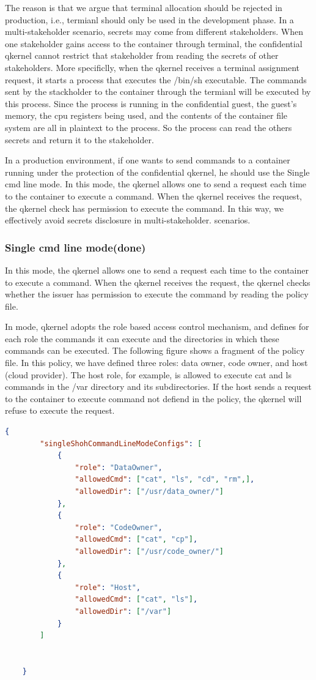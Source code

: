 The reason is that we argue that terminal allocation should be rejected in production, i.e., termianl should only be used in the development phase. In a multi-stakeholder scenario, secrets may come from different stakeholders. When one stakeholder 
gains access to the container through terminal, the confidential qkernel cannot restrict that stakeholder from reading the secrets of other stakeholders. More specificlly, when the qkernel receives a terminal assignment request, it starts a process 
that executes the /bin/sh executable. The commands sent by the stackholder to the container through the termianl will be executed by this process. Since the process is running in the confidential guest, the guest's memory, the cpu registers being 
used, and the contents of the container file system are all in plaintext to the process. So the process can read the others secrets and return it to the stakeholder.

In a production environment, if one wants to send commands to a container running under the protection of the confidential qkernel, he should use the Single cmd line mode. In this mode, the qkernel allows one to send a request each time to the container to execute a command. 
When the qkernel receives the request, the qkernel check has permission to execute the command. In this way, we effectively avoid secrets disclosure in multi-stakeholder.
scenarios.

\subsubsection{Single cmd line mode(done)}
In this mode, the qkernel allows one to send a request each time to the container to execute a command. 
When the qkernel receives the request, the qkernel checks whether the issuer has permission to execute the command by reading the policy file.

In mode, qkernel adopts the role based access control mechanism, and defines for each role the commands it can execute and the directories in which these commands can be executed. 
The following figure shows a fragment of the policy file. In this policy, we have defined three roles: data owner, code owner, and host (cloud provider). The host role, for example, is allowed 
to execute cat and ls commands in the /var directory and its subdirectories. If the host sends a request to the container to execute command not defiend in the policy, the qkernel will refuse 
to execute the request.
\begin{lstlisting}[language=json,firstnumber=1]
    {
        "singleShohCommandLineModeConfigs": [
            {   
                "role": "DataOwner",
                "allowedCmd": ["cat", "ls", "cd", "rm",],
                "allowedDir": ["/usr/data_owner/"]
            },
            {   
                "role": "CodeOwner",
                "allowedCmd": ["cat", "cp"],
                "allowedDir": ["/usr/code_owner/"]
            },
            {   
                "role": "Host",
                "allowedCmd": ["cat", "ls"],
                "allowedDir": ["/var"]
            }
        ]
    
    
    }
\end{lstlisting}



